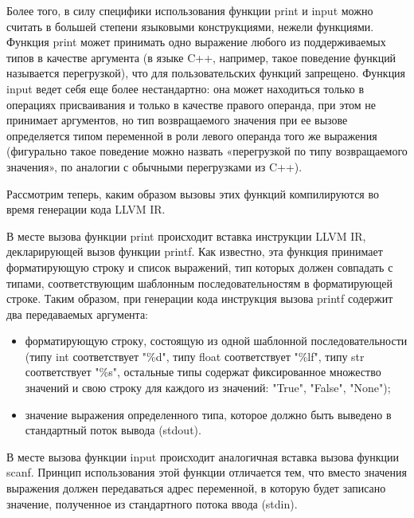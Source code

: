 Более того, в силу специфики использования функции print и input можно считать в большей степени языковыми конструкциями, нежели функциями.
Функция print может принимать одно выражение любого из поддерживаемых типов в качестве аргумента (в языке C++, например, такое поведение функций называется перегрузкой), что для пользовательских функций запрещено.
Функция input ведет себя еще более нестандартно: она может находиться только в операциях присваивания и только в качестве правого операнда, при этом не принимает аргументов, но тип возвращаемого значения при ее вызове определяется типом переменной в роли левого операнда того же выражения (фигурально такое поведение можно назвать «перегрузкой по типу возвращаемого значения», по аналогии с обычными перегрузками из C++).

Рассмотрим теперь, каким образом вызовы этих функций компилируются во время генерации кода LLVM IR.

В месте вызова функции print происходит вставка инструкции LLVM IR, декларирующей вызов функции printf.
Как известно, эта функция принимает форматирующую строку и список выражений, тип которых должен совпадать с типами, соответствующим шаблонным последовательностям в форматирующей строке.
Таким образом, при генерации кода инструкция вызова printf содержит два передаваемых аргумента:

\begin{itemize}
  \item форматирующую строку, состоящую из одной шаблонной последовательности (типу int соответствует "\%d", типу float соответствует "\%lf", типу str соответствует "\%s", остальные типы содержат фиксированное множество значений и свою строку для каждого из значений: "True", "False", "None");
  \item значение выражения определенного типа, которое должно быть выведено в стандартный поток вывода (stdout).
\end{itemize}

В месте вызова функции input происходит аналогичная вставка вызова функции scanf.
Принцип использования этой функции отличается тем, что вместо значения выражения должен передаваться адрес переменной, в которую будет записано значение, полученное из стандартного потока ввода (stdin).
